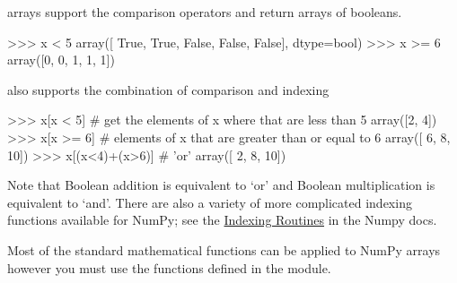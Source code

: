 \numpy arrays support the comparison operators and return arrays of
booleans.
\begin{python}
    >>> x < 5 
    array([ True, True, False, False, False], dtype=bool)
    >>> x >= 6 
    array([0, 0, 1, 1, 1])
\end{python}
%
\numpy also supports the combination of comparison and indexing
%
\begin{python}
>>> x[x < 5]  # get the elements of x where that are less than 5
array([2, 4])
>>> x[x >= 6]  # elements of x that are greater than or equal to 6
array([ 6,  8, 10])
>>> x[(x<4)+(x>6)]  # 'or'
array([ 2,  8, 10])
\end{python}
%
Note that Boolean addition is equivalent to `or' and Boolean
multiplication is equivalent to `and'.  There are also a variety of more complicated indexing functions
available for NumPy; see the
\href{http://docs.scipy.org/doc/numpy/reference/routines.indexing.html}{Indexing Routines} in the Numpy docs.

Most of the standard mathematical functions can be applied to NumPy
arrays however you must use the functions defined in the
\numpy module.
%



